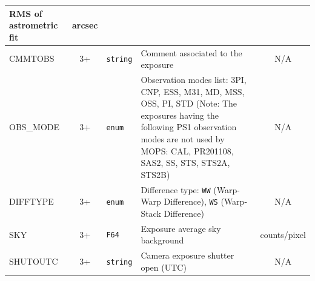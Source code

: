 \documentclass[panstarrs,spec]{panstarrs}
\begin{document}
\begin{center}
\begin{longtable}{|lcp{0.5in}p{3in}c|}
    RMS of astrometric fit & arcsec \\
    \hline CMMTOBS & 3+ & \texttt{string} &
    Comment associated to the exposure & N/A\\
    \hline OBS\_MODE & 3+ & \texttt{enum} & Observation modes list:
    3PI, CNP, ESS, M31, MD, MSS, OSS, PI, STD (Note: The exposures
    having the following PS1 observation modes are not used by MOPS:
    CAL, PR201108, SAS2, SS, STS, STS2A, STS2B) & N/A\\
    \hline DIFFTYPE & 3+ & \texttt{enum} &
    Difference type: \texttt{WW} (Warp-Warp Difference), \texttt{WS} (Warp-Stack Difference) & N/A\\
    \hline SKY & 3+ & \texttt{F64} &
    Exposure average sky background & counts/pixel \\
    \hline SHUTOUTC & 3+ & \texttt{string} &
    Camera exposure shutter open (UTC) & N/A \\
    \hline \hline
  \end{longtable}
\end{center}
\end{document}
